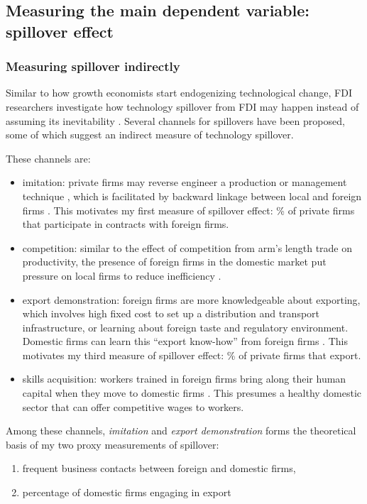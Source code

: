\subsection{Measuring the main dependent variable: spillover effect}
\label{sec:measure_spillover}

\subsubsection*{Measuring spillover indirectly}

Similar to how growth economists start endogenizing technological change, FDI researchers investigate how technology spillover from FDI may happen instead of assuming its inevitability \citep{Romer1994}. Several channels for spillovers have been proposed, some of which suggest an indirect measure of technology spillover.

These channels are:
\begin{itemize}
	\item imitation:  private firms may reverse engineer a production or management technique \citep{Wang1992}, which is facilitated by backward linkage between local and foreign firms \citep{Javorcik2004}. This motivates my first measure of spillover effect: \% of private firms that participate in contracts with foreign firms.
	\item competition: similar to the effect of competition from arm's length trade on productivity, the presence of foreign firms in the domestic market put pressure on local firms to reduce inefficiency \citep{Glass2002}.
	\item export demonstration: foreign firms are more knowledgeable about exporting, which involves high fixed cost to set up a distribution and transport infrastructure, or learning about foreign taste and regulatory environment. Domestic firms can learn this ``export know-how'' from foreign firms \citep{Aitken1997}. This motivates my third measure of spillover effect: \% of private firms that export.
	\item skills acquisition: workers trained in foreign firms bring along their human capital when they move to domestic firms \citep{Djankov2000}. This presumes a healthy domestic sector that can offer competitive wages to workers.
\end{itemize}

Among these channels, \textit{imitation} and \textit{export demonstration} forms the theoretical basis of my two proxy measurements of spillover:
\begin{enumerate}
\item frequent business contacts between foreign and domestic firms,
\item percentage of domestic firms engaging in export
\end{enumerate}

